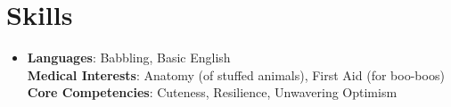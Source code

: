 \documentclass[letterpaper,11pt]{article}
\begin{document}
\section{Skills} %
\begin{itemize}[leftmargin=0.15in, label={}]
\item{
\textbf{Languages}{: Babbling, Basic English} \\
\textbf{Medical Interests}{: Anatomy (of stuffed animals), First Aid (for boo-boos)} \\
\textbf{Core Competencies}{: Cuteness, Resilience, Unwavering Optimism}
} \\
\end{itemize}


\end{document}
